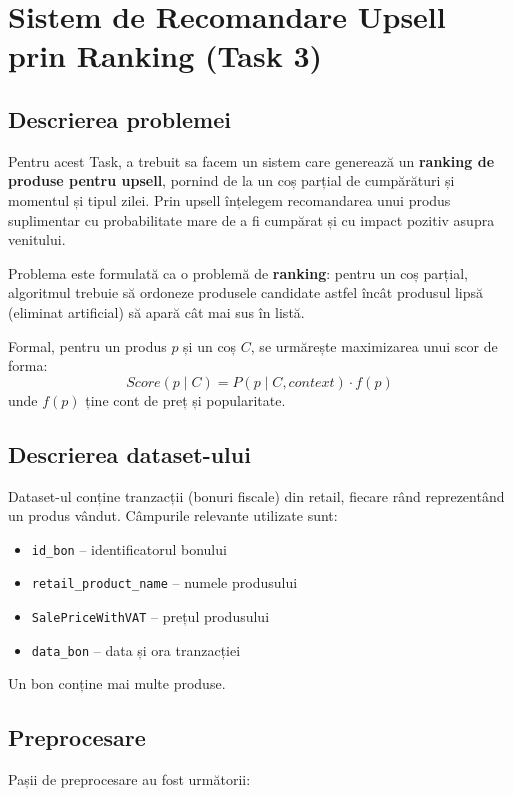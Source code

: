 \documentclass[12pt,a4paper]{article}
\begin{document}
\section{Sistem de Recomandare Upsell prin Ranking (Task 3)}
\subsection{Descrierea problemei}

Pentru acest Task, a trebuit sa facem un sistem care generează un \textbf{ranking de produse pentru upsell}, pornind de la un coș parțial de cumpărături și momentul și tipul zilei.  
Prin upsell înțelegem recomandarea unui produs suplimentar cu probabilitate mare de a fi cumpărat și cu impact pozitiv asupra venitului.

Problema este formulată ca o problemă de \textbf{ranking}: pentru un coș parțial, algoritmul trebuie să ordoneze produsele candidate astfel încât produsul lipsă (eliminat artificial) să apară cât mai sus în listă.

Formal, pentru un produs \( p \) și un coș \( C \), se urmărește maximizarea unui scor de forma:
\[
Score(p \mid C) = P(p \mid C, context) \cdot f(p)
\]
unde \( f(p) \) ține cont de preț și popularitate.

\subsection{Descrierea dataset-ului}

Dataset-ul conține tranzacții (bonuri fiscale) din retail, fiecare rând reprezentând un produs vândut. Câmpurile relevante utilizate sunt:
\begin{itemize}
    \item \texttt{id\_bon} – identificatorul bonului
    \item \texttt{retail\_product\_name} – numele produsului
    \item \texttt{SalePriceWithVAT} – prețul produsului
    \item \texttt{data\_bon} – data și ora tranzacției
\end{itemize}

Un bon conține mai multe produse.
\subsection{Preprocesare}

Pașii de preprocesare au fost următorii:
\end{document}
